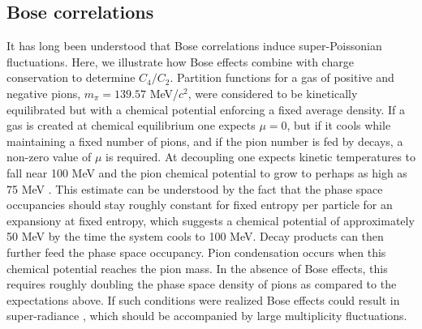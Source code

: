 \subsection{Bose correlations}

It has long been understood that Bose correlations induce super-Poissonian fluctuations. Here, we illustrate how Bose effects combine with charge conservation to determine $C_4/C_2$. Partition functions for a gas of positive and negative pions, $m_\pi=139.57$ MeV/$c^2$, were considered to be kinetically equilibrated but with a chemical potential enforcing a fixed average density. If a gas is created at chemical equilibrium one expects $\mu=0$, but if it cools while maintaining a fixed number of pions, and if the pion number is fed by decays, a non-zero value of $\mu$ is required. At decoupling one expects kinetic temperatures to fall near 100 MeV and the pion chemical potential to grow to perhaps as high as 75 MeV \cite{Greiner:1993jn}. This estimate can be understood by the fact that the phase space occupancies should stay roughly constant for fixed entropy per particle for an expansiony at fixed entropy, which suggests a chemical potential of approximately 50 MeV by the time the system cools to 100 MeV. Decay products can then further feed the phase space occupancy. Pion condensation occurs when this chemical potential reaches the pion mass. In the absence of Bose effects, this requires roughly doubling the phase space density of pions as compared to the expectations above. If such conditions were realized Bose effects could result in super-radiance \cite{}, which should be accompanied by large multiplicity fluctuations. 

